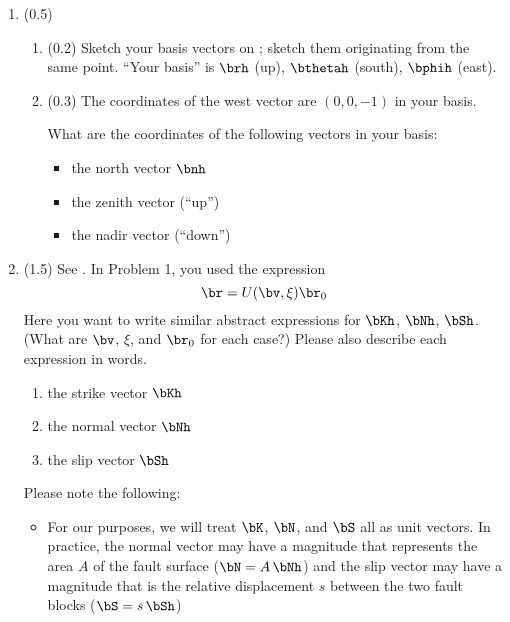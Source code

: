 \documentclass[11pt,titlepage,fleqn]{article}
\newcommand{\rotangB}{\xi}    %
\newcommand{\rotvec}{\bv}      %
\newcommand{\Umat}{U}
\begin{document}
\begin{enumerate}


\item (0.5)
\begin{enumerate}
\item (0.2) Sketch your basis vectors on ; sketch them originating from the same point. ``Your basis'' is $\brh$ (up), $\bthetah$ (south), $\bphih$ (east).

\item (0.3) The coordinates of the west vector are $(0,0,-1)$ in your basis.

What are the coordinates of the following vectors in your basis:

\begin{itemize}
\item the north vector $\bnh$

\item the zenith vector (``up'')

\item the nadir vector (``down'')
\end{itemize}
\end{enumerate}


\item (1.5) See . In Problem 1, you used the expression
%
\begin{equation}
\br = \Umat(\rotvec,\rotangB)\br_0
\end{equation}
%
Here you want to write similar abstract expressions for $\bKh$, $\bNh$, $\bSh$.
(What are $\rotvec$, $\rotangB$, and $\br_0$ for each case?)
Please also describe each expression in words.
%
\begin{enumerate}
\item the strike vector $\bKh$
\item the normal vector $\bNh$
\item the slip vector $\bSh$
\end{enumerate}
%
Please note the following:
%
\begin{itemize}
\item For our purposes, we will treat $\bK$, $\bN$, and $\bS$ all as unit vectors. In practice, the normal vector may have a magnitude that represents the area $A$ of the fault surface ($\bN = A\,\bNh$) and the slip vector may have a magnitude that is the relative displacement $s$ between the two fault blocks ($\bS = s\,\bSh$)


\end{itemize}
\end{enumerate}
\end{document}
